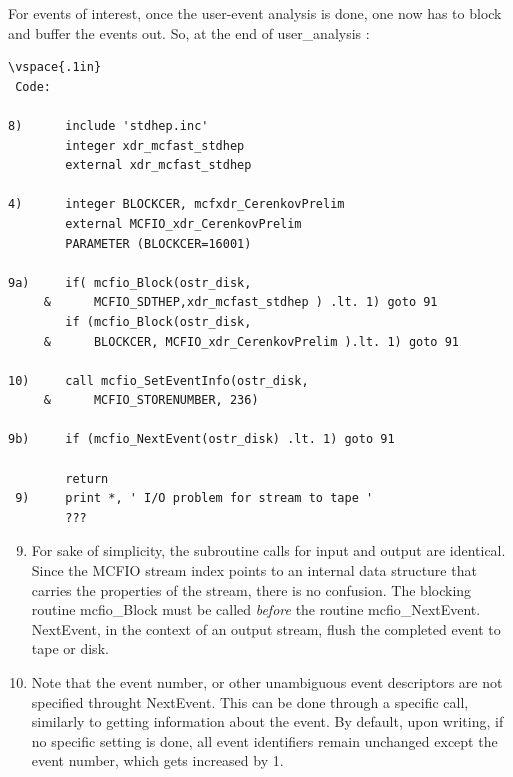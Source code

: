 For events of interest, once the user-event analysis is done, one now has to
block and buffer the events out. So, at the end  of user\_analysis :

\begin{verbatim}
\vspace{.1in}
 Code:

8)      include 'stdhep.inc'
        integer xdr_mcfast_stdhep
        external xdr_mcfast_stdhep

4)      integer BLOCKCER, mcfxdr_CerenkovPrelim
        external MCFIO_xdr_CerenkovPrelim
        PARAMETER (BLOCKCER=16001)

9a)     if( mcfio_Block(ostr_disk,
     &      MCFIO_SDTHEP,xdr_mcfast_stdhep ) .lt. 1) goto 91
        if (mcfio_Block(ostr_disk,
     &      BLOCKCER, MCFIO_xdr_CerenkovPrelim ).lt. 1) goto 91

10)     call mcfio_SetEventInfo(ostr_disk,
     &      MCFIO_STORENUMBER, 236)

9b)     if (mcfio_NextEvent(ostr_disk) .lt. 1) goto 91

        return
 9)     print *, ' I/O problem for stream to tape '
        ???

\end{verbatim}
\vspace{.1in}
\begin{enumerate}
\setcounter{enumi}{8}
\item For sake of simplicity, the subroutine calls for input and output are
identical. Since the MCFIO stream index points to  an internal data structure
that carries the properties of the  stream,  there is no confusion. The
blocking routine mcfio\_Block must be called {\em before}  the  routine
mcfio\_NextEvent.  NextEvent, in the context of an  output stream, flush the
completed event to tape or disk.

\item Note that the event number, or other unambiguous event descriptors are
not specified throught NextEvent.  This can be done through a specific call,
similarly  to getting information about the event. By default, upon writing, if
no specific setting is done, all event identifiers remain unchanged except
the event number, which gets increased by 1.

\end{enumerate}

